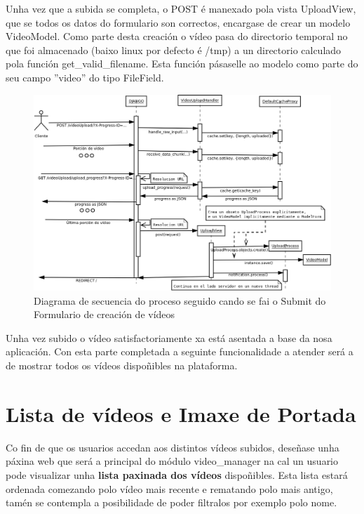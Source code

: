 	Unha vez que a subida se completa, o POST é manexado pola vista UploadView, que se todos
	os datos do formulario son correctos, encargase de crear un modelo VideoModel. Como parte
	desta creación o vídeo pasa do directorio temporal no que foi almacenado (baixo linux por 
	defecto é /tmp) a un directorio calculado pola función get\_valid\_filename. Esta función
	pásaselle ao modelo como parte do seu campo ''video'' do tipo FileField.
	
	\begin{figure}[htp]
	\begin{center}
		\includegraphics[scale=0.3]{figures/SubidaVideo.png}
		\caption{Diagrama de secuencia do proceso seguido cando se fai o Submit do Formulario 
		de creación de vídeos}
	\label{fig:SubidaVideo}
	\end{center}
	\end{figure}
	
	Unha vez subido o vídeo satisfactoriamente xa está asentada a base da nosa aplicación. Con esta
	parte completada a seguinte funcionalidade a atender será a de mostrar todos os vídeos 
	dispoñibles na plataforma.

\section{Lista de vídeos e Imaxe de Portada}
    Co fin de que os usuarios accedan aos distintos vídeos subidos, deseñase unha páxina web que será a
    principal do módulo video\_manager na cal un usuario pode visualizar unha \textbf{ lista paxinada dos
    vídeos} dispoñibles. Esta lista estará ordenada comezando polo vídeo mais recente e rematando
    polo mais antigo, tamén se contempla a posibilidade de poder filtralos por exemplo polo nome.
    

